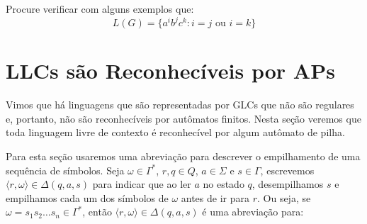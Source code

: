 \begin{example}
  \begin{center}
\end{center}

Procure verificar com alguns exemplos que:
\begin{displaymath}
L(G) = \{a^ib^jc^k : i = j \textrm{ ou } i = k\}
\end{displaymath}

\end{example}



\section{LLCs são Reconhecíveis por APs}
\label{sec:llc-ap}

Vimos que há linguagens que são representadas por GLCs que não são regulares e, portanto, não são reconhecíveis por autômatos finitos.
Nesta seção veremos que toda linguagem livre de contexto é reconhecível por algum autômato de pilha.

Para esta seção usaremos uma abreviação para descrever o empilhamento de uma sequência de símbolos.
Seja $\omega \in \Gamma^*$, $r, q \in Q$, $a \in \Sigma$ e $s \in \Gamma$, escrevemos $\langle r, \omega \rangle \in \Delta(q, a, s)$ para indicar que ao ler $a$ no estado $q$, desempilhamos $s$ e empilhamos cada um dos símbolos de $\omega$ antes de ir para $r$.
Ou seja, se $\omega = s_1 s_2 \dots s_n \in \Gamma^*$, então $\langle r, \omega \rangle \in \Delta(q, a, s)$ é uma abreviação para:


